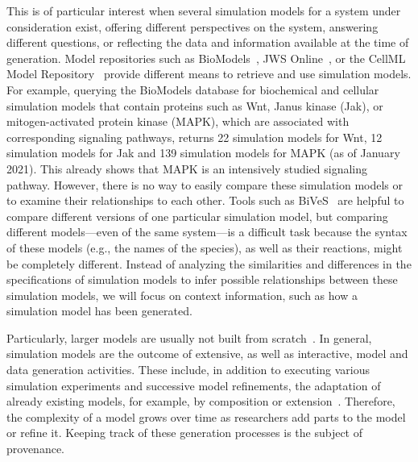 \documentclass[10pt,letterpaper]{article}
\newcommand{\wnt}{Wnt}
\begin{document}
This is of particular interest when several simulation models for a system under consideration exist, offering different perspectives on the system, answering different questions, or reflecting the data and information available at the time of generation.
Model repositories such as BioModels~\cite{BioModels2020, BioModels2018}, JWS Online~\cite{Snoep2004}, or the CellML Model Repository~\cite{Lloyd2008} provide different means to retrieve and use simulation models.
For example, querying the BioModels database for biochemical and cellular simulation models that contain proteins such as \wnt{}, Janus kinase (Jak), or mitogen-activated protein kinase (MAPK), which are associated with corresponding signaling pathways, returns 22 simulation models for \wnt{}, 12 simulation models for Jak and 139 simulation models for MAPK (as of January 2021).
This already shows that MAPK is an intensively studied signaling pathway.
However, there is no way to easily compare these simulation models or to examine their relationships to each other.
Tools such as BiVeS~\cite{Scharm2016a} are helpful to compare different versions of one particular simulation model, but comparing different models---even of the same system---is a difficult task because the syntax of these models (e.g., the names of the species), as well as their reactions, might be completely different.
Instead of analyzing the similarities and differences in the specifications of simulation models to infer possible relationships between these simulation models, we will focus on context information, such as how a simulation model has been generated.

Particularly, larger models are usually not built from scratch~\cite{Cvijovic2014}.
In general, simulation models are the outcome of extensive, as well as interactive, model and data generation activities. These include, in addition to executing various simulation experiments and successive model refinements, the adaptation of already existing models, for example, by composition or extension~\cite{Peng2017, Peng2016, Cvijovic2014}.
Therefore, the complexity of a model grows over time as researchers add parts to the model or refine it.
Keeping track of these generation processes is the subject of provenance.
\end{document}
